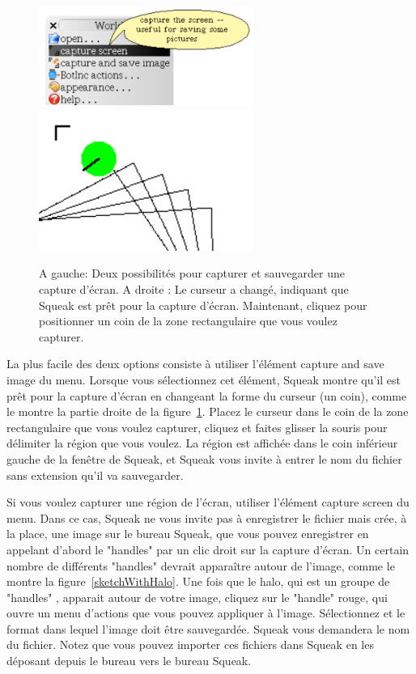 \documentclass[a4paper,10pt,twoside]{book}
\begin{document}
\begin{figure}[h]
\begin{center}
\includegraphics[width=7cm]{screenCapture}\includegraphics[width=7cm]{positioningScreen}
\caption{A gauche: Deux possibilit\'es pour capturer et sauvegarder une capture d'\'ecran. A droite : Le curseur a chang\'e, indiquant que Squeak est pr\^et pour la capture d'\'ecran. Maintenant, cliquez pour positionner un coin de la zone rectangulaire que vous voulez capturer. }\label{screenCapture}
\end{center}
\end{figure}


La plus facile des deux options consiste \`a utiliser l'\'el\'ement capture and save image du menu. Lorsque vous s\'electionnez cet \'el\'ement, Squeak montre qu'il est pr\^et pour la capture d'\'ecran en changeant la forme du curseur (un coin), comme le montre la partie droite de la figure~\ref{screenCapture}. Placez le curseur dans le coin de la zone rectangulaire que vous voulez capturer, cliquez et faites glisser la souris pour d\'elimiter la r\'egion que vous voulez. La r\'egion est affich\'ee dans le coin inf\'erieur gauche de la fen\^etre de Squeak, et Squeak vous invite \`a entrer le nom du fichier sans extension qu'il va sauvegarder. 


Si vous voulez capturer une r\'egion de l'\'ecran, utiliser l'\'el\'ement capture screen du menu. Dans ce cas, Squeak ne vous invite pas \`a enregistrer le fichier mais cr\'ee, \`a la place, une image sur le bureau Squeak, que vous pouvez enregistrer en appelant d'abord le "handles" par un clic droit sur la capture d'\'ecran. Un certain nombre de diff\'erents "handles" devrait appara\^itre autour de l'image, comme le montre la figure~\ref{sketchWithHalo}. Une fois que le halo, qui est un groupe de "handles" , apparait autour de votre image, cliquez sur le "handle" rouge, qui ouvre un menu d'actions que vous pouvez appliquer \`a l'image. S\'electionnez  et le format dans lequel l'image doit \^etre sauvegard\'ee. Squeak vous demandera le nom du fichier. Notez que vous pouvez importer ces fichiers dans Squeak en les d\'eposant depuis le bureau vers le bureau Squeak. 
\end{document}
